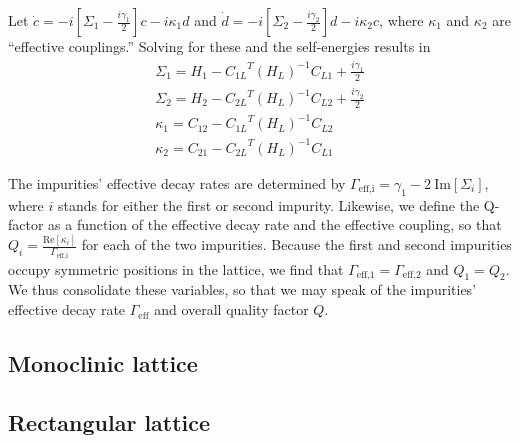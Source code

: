 \documentclass[aps,pra,superscriptaddress,twocolumn]{revtex4-1}
\newcommand{\re}{\mathrm{Re}}
\newcommand{\im}{\mathrm{Im}}
\newcommand{\commentTP}[1]{\texttt{\color{green}[#1]}}
\begin{document}
Let $\dot{c} = -i [\Sigma_1 - \frac{i \gamma_1}{2}]c - i \kappa_1 d $ and $\dot{d} = -i [ \Sigma_2 - \frac{i \gamma_2}{2} ] d - i \kappa_2 c $, where $\kappa_1$ and $\kappa_2$ are ``effective couplings.'' Solving for these and the self-energies results in 
\begin{subequations}
    \begin{align}
        \Sigma_1 = H_1 - {C_{1L}}^T (H_L)^{-1} C_{L1} + \frac{i \gamma_1}{2} \\
        \Sigma_2 = H_2 - {C_{2L}}^T (H_L)^{-1} C_{L2} + \frac{i \gamma_2}{2} \\
        \kappa_1 = C_{12} - {C_{1L}}^T (H_L)^{-1} C_{L2} \\
        \kappa_2 = C_{21} - {C_{2L}}^T (H_L)^{-1} C_{L1} 
    \end{align}
\end{subequations}

The impurities' effective decay rates are determined by $\Gamma_\text{eff,i} = \gamma_1 - 2~\im[\Sigma_i]$, where $i$ stands for either the first or second impurity. Likewise, we define the Q-factor as a function of the effective decay rate and the effective coupling, so that $ Q_i = \frac{\re[\kappa_i]}{\Gamma_\text{eff,i}} $ for each of the two impurities. Because the first and second impurities occupy symmetric positions in the lattice, we find that $\Gamma_\text{eff,1} = \Gamma_\text{eff,2}$ and $Q_1 = Q_2$. We thus consolidate these variables, so that we may speak of the impurities' effective decay rate $\Gamma_\text{eff}$ and overall quality factor $Q$. 




\subsection{Monoclinic lattice}


\subsection{Rectangular lattice}


\end{document}
